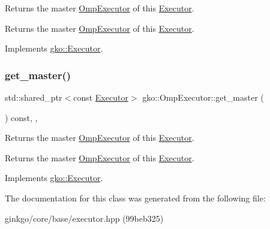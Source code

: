 Returns the master \hyperlink{classgko_1_1OmpExecutor}{Omp\+Executor} of this \hyperlink{classgko_1_1Executor}{Executor}. 

\begin{DoxyReturn}{Returns}
the master \hyperlink{classgko_1_1OmpExecutor}{Omp\+Executor} of this \hyperlink{classgko_1_1Executor}{Executor}. 
\end{DoxyReturn}


Implements \hyperlink{classgko_1_1Executor_acaec4f999d52fc71e5e5a3d3ad93609c}{gko\+::\+Executor}.

\mbox{\label{classgko_1_1OmpExecutor_ab297a7eba78463784d4d2ca08b03c675}} 
\subsubsection{\texorpdfstring{get\+\_\+master()}{get\_master()}\hspace{0.1cm}{\footnotesize\ttfamily [2/2]}}
{\footnotesize\ttfamily std\+::shared\+\_\+ptr$<$const \hyperlink{classgko_1_1Executor}{Executor}$>$ gko\+::\+Omp\+Executor\+::get\+\_\+master (\begin{DoxyParamCaption}{ }\end{DoxyParamCaption}) const\hspace{0.3cm}{\ttfamily [override]}, {\ttfamily [virtual]}, {\ttfamily [noexcept]}}



Returns the master \hyperlink{classgko_1_1OmpExecutor}{Omp\+Executor} of this \hyperlink{classgko_1_1Executor}{Executor}. 

\begin{DoxyReturn}{Returns}
the master \hyperlink{classgko_1_1OmpExecutor}{Omp\+Executor} of this \hyperlink{classgko_1_1Executor}{Executor}. 
\end{DoxyReturn}


Implements \hyperlink{classgko_1_1Executor_a261386e439c8daa6e0d95dc331b9bfeb}{gko\+::\+Executor}.



The documentation for this class was generated from the following file\+:\begin{DoxyCompactItemize}
\item 
ginkgo/core/base/executor.\+hpp (99beb325)\end{DoxyCompactItemize}
